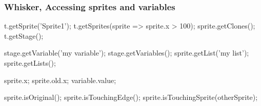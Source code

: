 \begin{frame}[fragile]\frametitle{Whisker, Accessing sprites and variables}
    \vspace{-\bigskipamount}
    \begin{minipage}{.7\textwidth}\end{minipage}%
    \hspace{-.4\textwidth}%
    \begin{minipage}{.6\textwidth}
        \begin{javascriptcode}
            t.getSprite('Sprite1');
            t.getSprites(sprite => sprite.x > 100);
            sprite.getClones();
            t.getStage();

            stage.getVariable('my variable');
            stage.getVariables();
            sprite.getList('my list');
            sprite.getLists();

            sprite.x;
            sprite.old.x;
            variable.value;

            sprite.isOriginal();
            sprite.isTouchingEdge();
            sprite.isTouchingSprite(otherSprite);
        \end{javascriptcode}
    \end{minipage}
\end{frame}

